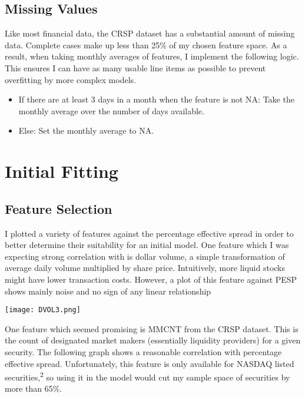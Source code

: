 \documentclass{article}
\begin{document}
\begin{multicols}{2}
\subsection{Missing Values}
Like most financial data, the CRSP dataset has a substantial amount of missing data. Complete cases make up less than 25\% of my chosen feature space. As a result, when taking monthly averages of features, I implement the following logic. This ensures I can have as many usable line items as possible to prevent overfitting by more complex models.



\begin{itemize}
  \item If there are at least 3 days in a month when the feature is not NA: Take the monthly average over the number of days available.
\item Else: Set the monthly average to NA.
\end{itemize}


\section{Initial Fitting}

\subsection{Feature Selection}
\par
I plotted a variety of features against the percentage effective spread in order to better determine their suitability for an initial model. One feature which I was expecting strong correlation with is dollar volume, a simple transformation of average daily volume multiplied by share price. Intuitively, more liquid stocks might have lower transaction costs. However, a plot of this feature against PESP shows mainly noise and no sign of any linear relationship \par

\begingroup
    \centering
    \texttt{[image: DVOL3.png]}
\endgroup
\vspace{3mm}
\par

\par
One feature which seemed promising is MMCNT from the CRSP dataset. This is the count of designated market makers (essentially liquidity providers) for a given security. The following graph shows a reasonable correlation with percentage effective spread. Unfortunately, this feature is only available for NASDAQ listed securities,\textsuperscript{2} so using it in the model would cut my sample space of securities by more than 65\%.


\end{multicols}
\end{document}
